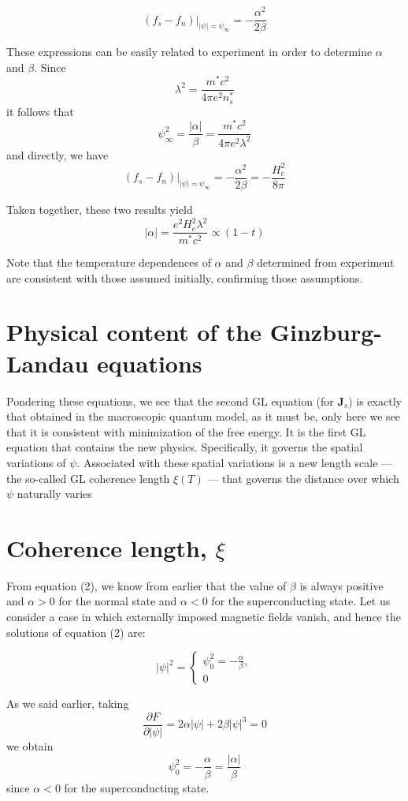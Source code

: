 \documentclass{article}
\begin{document}
\[
(f_s - f_n) \bigg|_{|\psi| = \psi_\infty} = - \frac{\alpha^2}{2\beta} \tag{34}
\]

These expressions can be easily related to experiment in order to determine $\alpha$ and $\beta$. Since
\[
\lambda^2 = \frac{m^* c^2}{4\pi e^2 n_s^*} \tag{35}
\]
it follows that
\[
\psi_\infty^2 = \frac{|\alpha|}{\beta} = \frac{m^* c^2}{4\pi e^2 \lambda^2} \tag{36}
\]
and directly, we have
\[
(f_s - f_n) \bigg|_{|\psi| = \psi_\infty} = - \frac{\alpha^2}{2\beta} = - \frac{H_c^2}{8\pi} \tag{37}
\]

Taken together, these two results yield
\[
|\alpha| = \frac{e^2 H_c^2 \lambda^2}{m^* c^2} \propto (1 - t) \tag{38}
\]

Note that the temperature dependences of $\alpha$ and $\beta$ determined from experiment are consistent with those assumed initially, confirming those assumptions.

\section{Physical content of the Ginzburg-Landau equations}

Pondering these equations, we see that the second GL equation (for $\mathbf{J}_s$) is exactly that obtained in the macroscopic quantum model, as it must be, only here we see that it is consistent with minimization of the free energy. It is the first GL equation that contains the new physics. Specifically, it governs the spatial variations of $\psi$. Associated with these spatial variations is a new length scale — the so-called GL coherence length $\xi(T)$ — that governs the distance over which $\psi$ naturally varies 

\section{Coherence length, $\xi$}

From equation (2), we know from earlier that the value of $\beta$ is always positive and $\alpha > 0$ for the normal state and $\alpha < 0$ for the superconducting state. Let us consider a case in which externally imposed magnetic fields vanish, and hence the solutions of equation (2) are:

\[
|\psi|^2 = 
\begin{cases}
    \psi_0^2 = -\frac{\alpha}{\beta}, \\
    0
\end{cases} \tag{39}
\]

As we said earlier, taking
\[
\frac{\partial F}{\partial |\psi|} = 2 \alpha |\psi| + 2 \beta |\psi|^3 = 0
\]
we obtain
\[
\psi_0^2 = - \frac{\alpha}{\beta} = \frac{|\alpha|}{\beta}
\]
since $\alpha < 0$ for the superconducting state.
\end{document}
